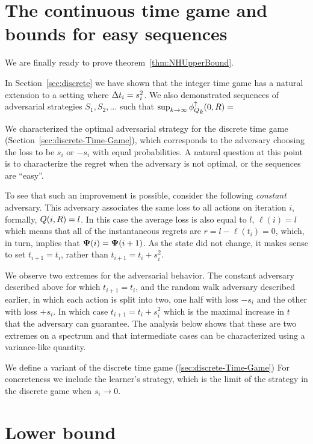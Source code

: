\documentclass{article}[12pt]
\begin{document}
\section{The continuous time game and bounds for easy
  sequences} \label{sec:easy}

We are finally ready to prove theorem~\ref{thm:NHUpperBound}.

In Section~\ref{sec:discrete} we have shown that the integer time game
has a natural extension to a setting where $\Delta t_i = s_i^2$. We
also demonstrated sequences of adversarial strategies $S_1,S_2,\ldots$
such that $\sup_{k \to \infty} {\phi_{Q}^{\uparrow}}_k(0,R) = $

We characterized the optimal adversarial strategy for the discrete
time game (Section~\ref{sec:discrete-Time-Game}), which corresponds
to the adversary choosing the loss to be $s_i$ or $-s_i$ with equal
probabilities. A natural question at this point is to characterize the
regret when the adversary is not optimal, or the sequences are ``easy''.

To see that such an improvement is possible, consider the following
{\em constant} adversary. This adversary associates the same loss to
all actions on iteration $i$, formally, $Q(i,R) = l$. In this
case the average loss is also equal to $l$, $\ell(i)=l$ which means
that all of the instantaneous regrets are $r=l-\ell(t_i) = 0$, which,
in turn, implies that ${\bf \Psi}(i) = {\bf \Psi}(i+1)$. As the state did not
change, it makes sense to set $t_{i+1}=t_i$, rather than
$t_{i+1}=t_i+s_i^2$.

We observe two extremes for the adversarial behavior. The constant
adversary described above for which $t_{i+1} = t_i$, and the random walk adversary described
earlier, in which each action is split into two, one half with loss
$-s_i$ and the other with loss $+s_i$. In which case $t_{i+1} =
t_i+s_i^2$ which is the maximal increase in $t$ that the adversary can
guarantee. The analysis below shows that these are two extremes on a
spectrum and that intermediate cases can be characterized using a
variance-like quantity.

We define a variant of the discrete time game
(\ref{sec:discrete-Time-Game}) For concreteness we include the
learner's strategy, which is the limit of the strategy in the discrete
game when $s_i \to 0$.


\section{Lower bound} \label{sec:lowerbound}
\end{document}
